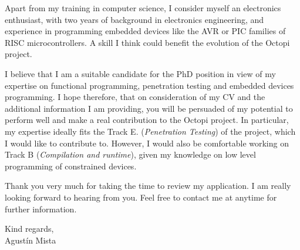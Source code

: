 \documentclass[helvetica,notitle,flagCMYK,totpages,11pt]{europecv}
\begin{document}
Apart from my training in computer science, I consider myself an electronics
enthusiast, with two years of background in electronics engineering, and
experience in programming embedded devices like the AVR or PIC families of RISC
microcontrollers.
%
A skill I think could benefit the evolution of the Octopi project.


I believe that I am a suitable candidate for the PhD position in view of my
expertise on functional programming, penetration testing and embedded devices
programming.
%
I hope therefore, that on consideration of my CV and the additional information
I am providing, you will be persuaded of my potential to perform well and make a
real contribution to the Octopi project.
%
In particular, my expertise ideally fits the Track E. (\emph{{Penetration
    Testing}}) of the project, which I would like to contribute to.
%
However, I would also be comfortable working on Track B (\emph{Compilation and
  runtime}), given my knowledge on low level programming of constrained devices.


Thank you very much for taking the time to review my application. I am really
looking forward to hearing from you. Feel free to contact me at anytime for
further information.


\vfill
Kind regards,\\
Agustín Mista
\end{document}
